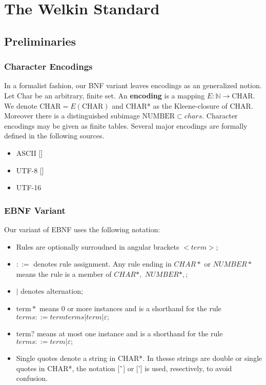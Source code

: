 

\chapter{The Welkin Standard}

\section{Preliminaries}

\newcommand*{\chars}{\mathrm{CHAR}}
\newcommand*{\numbers}{\mathrm{NUMBER}}
\newcommand*{\term}{\mathrm{term}}

\subsection{Character Encodings}
In a formalist fashion, our BNF variant leaves encodings as an generalized notion. Let Char be an arbitrary, finite set.
An \textbf{encoding} is a mapping $E : \mathbb{N} \to \chars.$
We denote $\chars = E(\chars)$ and CHAR* as the Kleene-closure of CHAR. Moreover there is a distinguished subimage $\numbers \subset chars.$ Character encodings may be given as finite tables. Several major encodings are formally defined in the following sources.
\begin{itemize}
	\item ASCII []
	\item UTF-8 []
	\item UTF-16
\end{itemize}

\subsection{EBNF Variant}
Our variant of EBNF uses the following notation:
\begin{itemize}
	\item Rules are optionally surroudned in angular brackets $<term>;$
	\item $::=$ denotes rule assignment. Any rule ending in $CHAR*$ or $NUMBER*$ means the rule is a member of $CHAR*,$ $NUMBER*,$;
	\item $|$ denotes alternation;
	\item $\term*$ means 0 or more instances and is a shorthand for the rule $terms ::= term terms | term | \varepsilon;$
	\item $\term?$ means at most one instance and is a shorthand for the rule $terms ::= term | \varepsilon;$
	\item Single quotes denote a string in CHAR*. In thesse strings are double or single quotes in CHAR*, the notation [\``] or ['] is used, resectively, to avoid confusion.
\end{itemize}

